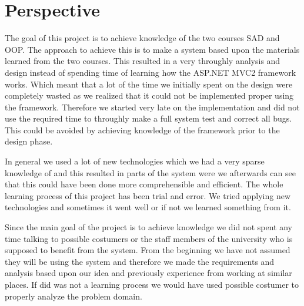 \chapter{Perspective}
\label{chap:perspective}

The goal of this project is to achieve knowledge of the two courses SAD and OOP. The approach to achieve this is to make a system based upon the materials learned from the two courses. 
This resulted in a very throughly analysis and design instead of spending time of learning how the ASP.NET MVC2 framework works.
Which meant that a lot of the time we initially spent on the design were completely wasted as we realized that it could not be implemented proper using the framework. 
Therefore we started very late on the implementation and did not use the required time to throughly make a full system test and correct all bugs. 
This could be avoided by achieving knowledge of the framework prior to the design phase. 




In general we used a lot of new technologies which we had a very sparse knowledge of and this resulted in parts of the system were we afterwards can see that this could have been done more comprehensible and efficient. 
The whole learning process of this project has been trial and error. 
We tried applying new technologies and sometimes it went well or if not we learned something from it. 








Since the main goal of the project is to achieve knowledge we did not spent any time talking to possible costumers or the staff members of the university who is supposed to benefit from the system. From the beginning we have not assumed they will be using the system and therefore we made the requirements and analysis based upon our idea and previously experience from working at similar places. 
If did was not a learning process we would have used possible costumer to properly analyze the problem domain. 


